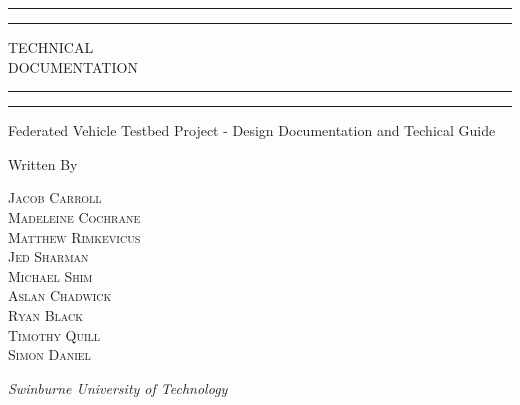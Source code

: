 \documentclass{report}
\begin{document}
\begin{titlepage}
  \centering
  \scshape
  \vspace*{\baselineskip}


  \rule{\textwidth}{1.6pt}\vspace*{-\baselineskip}\vspace*{2pt} %
	\rule{\textwidth}{0.4pt} %

	\vspace{0.75\baselineskip} %

	{\LARGE TECHNICAL\\ DOCUMENTATION\\} %

	\vspace{0.75\baselineskip} %

	\rule{\textwidth}{0.4pt}\vspace*{-\baselineskip}\vspace{3.2pt} %
	\rule{\textwidth}{1.6pt} %

	\vspace{2\baselineskip} %


	Federated Vehicle Testbed Project - Design Documentation and Techical Guide %

	\vspace*{3\baselineskip} %


	Written By

	\vspace{0.5\baselineskip} %

	{\scshape\Large
  Jacob Carroll \\
	Madeleine Cochrane \\
	Matthew Rimkevicus \\
	Jed Sharman \\
	Michael Shim \\
	Aslan Chadwick \\
	Ryan Black \\
	Timothy Quill \\
	Simon Daniel} %

	\vspace{0.5\baselineskip} %

	\textit{Swinburne University of Technology} %

	\vfill %
\end{titlepage}
\end{document}
